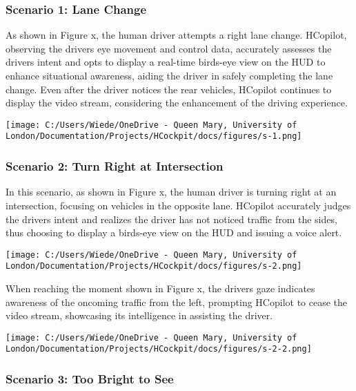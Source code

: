 \documentclass[
]{article}
\begin{document}
\subsubsection{Scenario 1: Lane Change}\label{scenario-1-lane-change}

As shown in Figure x, the human driver attempts a right lane change.
HCopilot, observing the driver\textquotesingle s eye movement and
control data, accurately assesses the driver\textquotesingle s intent
and opts to display a real-time bird\textquotesingle s-eye view on the
HUD to enhance situational awareness, aiding the driver in safely
completing the lane change. Even after the driver notices the rear
vehicles, HCopilot continues to display the video stream, considering
the enhancement of the driving experience.

\texttt{[image: C:/Users/Wiede/OneDrive - Queen Mary, University of London/Documentation/Projects/HCockpit/docs/figures/s-1.png]}

\subsubsection{Scenario 2: Turn Right at
Intersection}\label{scenario-2-turn-right-at-intersection}

In this scenario, as shown in Figure x, the human driver is turning
right at an intersection, focusing on vehicles in the opposite lane.
HCopilot accurately judges the driver\textquotesingle s intent and
realizes the driver has not noticed traffic from the sides, thus
choosing to display a bird\textquotesingle s-eye view on the HUD and
issuing a voice alert.

\texttt{[image: C:/Users/Wiede/OneDrive - Queen Mary, University of London/Documentation/Projects/HCockpit/docs/figures/s-2.png]}

When reaching the moment shown in Figure x, the driver\textquotesingle s
gaze indicates awareness of the oncoming traffic from the left,
prompting HCopilot to cease the video stream, showcasing its
intelligence in assisting the driver.

\texttt{[image: C:/Users/Wiede/OneDrive - Queen Mary, University of London/Documentation/Projects/HCockpit/docs/figures/s-2-2.png]}

\subsubsection{Scenario 3: Too Bright to
See}\label{scenario-3-too-bright-to-see}
\end{document}
